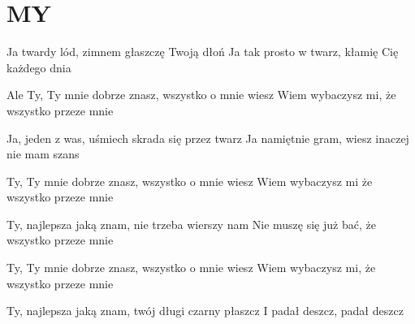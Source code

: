 \documentclass[../../../songbook.tex]{subfiles}
\begin{document}
\TabPositions{8cm} %
\section*{MY}
\vspace{0.5cm}

Ja twardy lód, zimnem głaszczę Twoją dłoń		 \newline
Ja tak prosto w twarz, kłamię Cię każdego dnia		 \newline

\-\hspace{0.5cm} Ale Ty, Ty mnie dobrze znasz, wszystko o mnie wiesz	 \newline
\-\hspace{0.5cm} Wiem wybaczysz mi, że wszystko przeze mnie		 \tab \quad \quad \quad {}\newline

Ja, jeden z was, uśmiech skrada się przez twarz \newline
Ja namiętnie gram, wiesz inaczej nie mam szans \newline

\-\hspace{1cm} Ty, Ty mnie dobrze znasz, wszystko o mnie wiesz \newline
\-\hspace{1cm} Wiem wybaczysz mi że wszystko przeze mnie \newline

\-\hspace{1cm} Ty, najlepsza jaką znam, nie trzeba wierszy nam \newline
\-\hspace{1cm} Nie muszę się już bać, że wszystko przeze mnie \newline

\-\hspace{1cm} Ty, Ty mnie dobrze znasz, wszystko o mnie wiesz \newline
\-\hspace{1cm} Wiem wybaczysz mi, że wszystko przeze mnie \newline
 
\-\hspace{1cm} Ty, najlepsza jaką znam, twój długi czarny płaszcz \newline
\-\hspace{1cm} I padał deszcz, padał deszcz \newline
	
\end{document}
